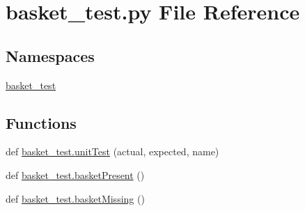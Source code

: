 \section{basket\+\_\+test.\+py File Reference}
\label{basket__test_8py}
\subsection*{Namespaces}
\begin{DoxyCompactItemize}
\item 
 \hyperlink{namespacebasket__test}{basket\+\_\+test}
\end{DoxyCompactItemize}
\subsection*{Functions}
\begin{DoxyCompactItemize}
\item 
def \hyperlink{namespacebasket__test_a6684d8ef9727f3f17d5177625d63f05b}{basket\+\_\+test.\+unit\+Test} (actual, expected, name)
\item 
def \hyperlink{namespacebasket__test_a6e9197dadee8f8fbbaef4c0015ba70d0}{basket\+\_\+test.\+basket\+Present} ()
\item 
def \hyperlink{namespacebasket__test_a02ba4e0e23e1661fbf650bfe5024dd5b}{basket\+\_\+test.\+basket\+Missing} ()
\end{DoxyCompactItemize}
